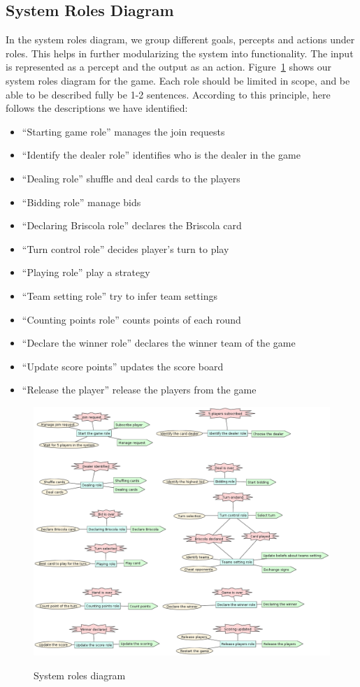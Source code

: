 \documentclass[a4paper]{article}
\begin{document}
\subsection{System Roles Diagram}

In the system roles diagram, we group different goals, percepts and actions under roles. This helps in further modularizing the system into functionality. The input is represented as a percept and the output as an action. Figure~\ref{fig:sysroles} shows our system roles diagram for the game. Each role should be limited in scope, and be able to be described fully be 1-2 sentences. According to this principle, here follows the descriptions we have identified:
\begin{itemize}
  \item ``Starting game role'' manages the join requests
  \item ``Identify the dealer role'' identifies who is the dealer in the game
  \item ``Dealing role'' shuffle and deal cards to the players
  \item ``Bidding role'' manage bids
  \item ``Declaring Briscola role'' declares the Briscola card
  \item ``Turn control role'' decides player's turn to play
  \item ``Playing role'' play a strategy
  \item ``Team setting role'' try to infer team settings
  \item ``Counting points role'' counts points of each round
  \item ``Declare the winner role'' declares the winner team of the game
  \item ``Update score points'' updates the score board 
  \item ``Release the player'' release the players from the game
\end{itemize} 

\begin{figure}[htp]
  \centering
  \includegraphics[keepaspectratio,scale=0.4]{pdt/images/system_specification/system_roles.png}
  \label{fig:sysroles}
  \caption{System roles diagram}
\end{figure}
\end{document}
